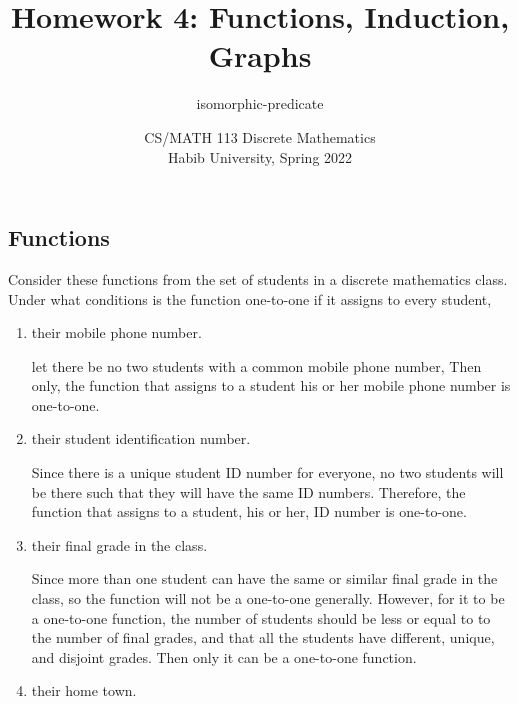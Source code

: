 \documentclass[addpoints]{exam}
\title{Homework 4: Functions, Induction, Graphs}
\author{isomorphic-predicate}  %
\date{CS/MATH 113 Discrete Mathematics\\Habib University, Spring 2022}
\begin{document}
\maketitle

\begin{questions}

  \section*{Functions}
  
\question[5] Consider these functions from the set of students in a discrete mathematics class. Under what conditions is the
  function one-to-one if it assigns to every student,
  
  \begin{enumerate}[label=\alph*)]
  \item their mobile phone number.
    \begin{solution}
      let there be no two students with a common mobile phone number, 
      \newline Then only, the function that assigns to a student his or her mobile phone number is one-to-one.
    \end{solution}
  \item their student identification number.
    \begin{solution}
      Since there is a unique student ID number for everyone, no two students will be there 
      \newline such that they will have the same ID numbers. Therefore, the function that assigns
      \newline to a student, his or her, ID number is one-to-one. 
    \end{solution}
  \item their final grade in the class.
    \begin{solution}
      Since more than one student can have the same or similar final grade in the class, so the function will not be a one-to-one
      \newline generally. 
      \newline However, for it to be a one-to-one function, the number of students should be less or equal to 
      \newline to the number of final grades, and that all the students have different, unique, and disjoint grades. 
      \newline Then only it can be a one-to-one function. 
    \end{solution}
  \item their home town.

\end{enumerate}
\end{questions}
\end{document}
